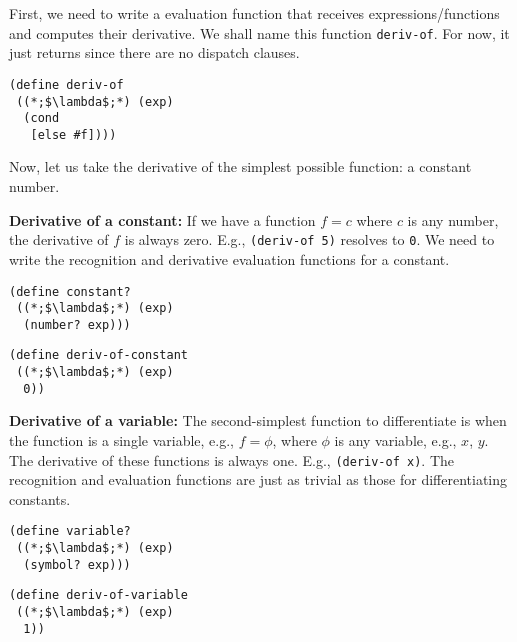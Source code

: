 First, we need to write a evaluation function that receives expressions/functions and computes their derivative. We shall name this function \texttt{deriv-of}. For now, it just returns  since there are no dispatch clauses.

\begin{cl}[]{}\begin{lstlisting}[language=MyScheme]
(define deriv-of
 ((*;$\lambda$;*) (exp)
  (cond
   [else #f])))
\end{lstlisting}\end{cl}

Now, let us take the derivative of the simplest possible function: a constant number. 

\textbf{Derivative of a constant:} If we have a function $f=c$ where $c$ is any number, the derivative of $f$ is always zero. E.g., \texttt{(deriv-of 5)} resolves to \texttt{0}. We need to write the recognition and derivative evaluation functions for a constant.

\begin{clrr}[]{}
\begin{lstlisting}[language=MyScheme]
(define constant?
 ((*;$\lambda$;*) (exp)
  (number? exp)))
\end{lstlisting}
\tcblower
\begin{lstlisting}[language=MyNLNScheme]
(define deriv-of-constant
 ((*;$\lambda$;*) (exp)
  0))
\end{lstlisting}
\end{clrr}

\textbf{Derivative of a variable:} The second-simplest function to differentiate is when the function is a single variable, e.g., $f=\phi$, where $\phi$ is any variable, e.g., $x$, $y$. The derivative of these functions is always one. E.g., \texttt{(deriv-of \textquotesingle{}x)}. The recognition and evaluation functions are just as trivial as those for differentiating constants.

\begin{clrr}[]{}
\begin{lstlisting}[language=MyScheme]
(define variable?
 ((*;$\lambda$;*) (exp)
  (symbol? exp)))
\end{lstlisting}
\tcblower
\begin{lstlisting}[language=MyNLNScheme]
(define deriv-of-variable
 ((*;$\lambda$;*) (exp)
  1))
\end{lstlisting}
\end{clrr}


